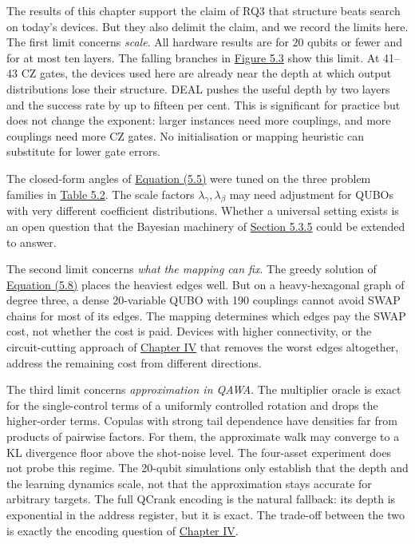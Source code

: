 \documentclass{report}
\theoremstyle{plain}
\theoremstyle{definition}
\theoremstyle{remark}
\begin{document}
The results of this chapter support the claim of RQ3 that structure beats search on today's devices. But they also delimit the claim, and we record the limits here. The first limit concerns \emph{scale}. All hardware results are for 20 qubits or fewer and for at most ten layers. The falling branches in \hyperref[fig:nisq:deal-success]{Figure 5.3} show this limit. At 41--43 CZ gates, the devices used here are already near the depth at which output distributions lose their structure. DEAL pushes the useful depth by two layers and the success rate by up to fifteen per cent. This is significant for practice but does not change the exponent: larger instances need more couplings, and more couplings need more CZ gates. No initialisation or mapping heuristic can substitute for lower gate errors.

The closed-form angles of \hyperref[eq:nisq:init]{Equation (5.5)} were tuned on the three problem families in \hyperref[tab:nisq:problems]{Table 5.2}. The scale factors $\lambda_{\gamma},\lambda_{\beta}$ may need adjustment for QUBOs with very different coefficient distributions. Whether a universal setting exists is an open question that the Bayesian machinery of \hyperref[sec:nisq:zne]{Section 5.3.5} could be extended to answer.

The second limit concerns \emph{what the mapping can fix}. The greedy solution of \hyperref[eq:nisq:mapping]{Equation (5.8)} places the heaviest edges well. But on a heavy-hexagonal graph of degree three, a dense 20-variable QUBO with 190 couplings cannot avoid SWAP chains for most of its edges. The mapping determines which edges pay the SWAP cost, not whether the cost is paid. Devices with higher connectivity, or the circuit-cutting approach of \hyperref[ch:qml]{Chapter IV} that removes the worst edges altogether, address the remaining cost from different directions.

The third limit concerns \emph{approximation in QAWA}. The multiplier oracle is exact for the single-control terms of a uniformly controlled rotation and drops the higher-order terms. Copulas with strong tail dependence have densities far from products of pairwise factors. For them, the approximate walk may converge to a KL divergence floor above the shot-noise level. The four-asset experiment does not probe this regime. The 20-qubit simulations only establish that the depth and the learning dynamics scale, not that the approximation stays accurate for arbitrary targets. The full QCrank encoding is the natural fallback: its depth is exponential in the address register, but it is exact. The trade-off between the two is exactly the encoding question of \hyperref[ch:qml]{Chapter IV}.
\end{document}
